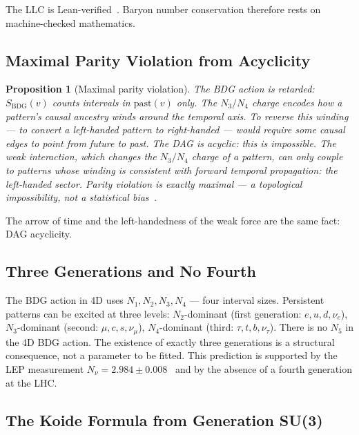 \documentclass[11pt,a4paper]{article}
\newtheorem{proposition}[theorem]{Proposition}
\newcommand{\SBDG}{S_{\mathrm{BDG}}}
\begin{document}
The LLC is Lean-verified~\citep{Sandeman2026RAGC}. Baryon number
conservation therefore rests on machine-checked mathematics.

\subsection{Maximal Parity Violation from Acyclicity}

\begin{proposition}[Maximal parity violation]
\label{prop:parity}
The BDG action is retarded: $\SBDG(v)$ counts intervals in
$\mathrm{past}(v)$ only. The $N_3/N_4$ charge encodes how a pattern's
causal ancestry winds around the temporal axis. To reverse this winding
--- to convert a left-handed pattern to right-handed --- would require
some causal edges to point from future to past. The DAG is acyclic:
this is impossible. The weak interaction, which changes the $N_3/N_4$
charge of a pattern, can only couple to patterns whose winding is
consistent with forward temporal propagation: the left-handed sector.
Parity violation is exactly maximal --- a topological impossibility,
not a statistical bias~\citep{Sandeman2026RASM}.
\end{proposition}

The arrow of time and the left-handedness of the weak force are the
same fact: DAG acyclicity.

\subsection{Three Generations and No Fourth}

The BDG action in 4D uses $N_1, N_2, N_3, N_4$ --- four interval
sizes. Persistent patterns can be excited at three levels:
$N_2$-dominant (first generation: $e, u, d, \nu_e$),
$N_3$-dominant (second: $\mu, c, s, \nu_\mu$),
$N_4$-dominant (third: $\tau, t, b, \nu_\tau$).
There is no $N_5$ in the 4D BDG action. The existence of exactly three
generations is a structural consequence, not a parameter to be fitted.
This prediction is supported by the LEP measurement $N_\nu = 2.984 \pm
0.008$~\citep{PDG2022} and by the absence of a fourth generation at the LHC.

\subsection{The Koide Formula from Generation SU(3)}
\end{document}
